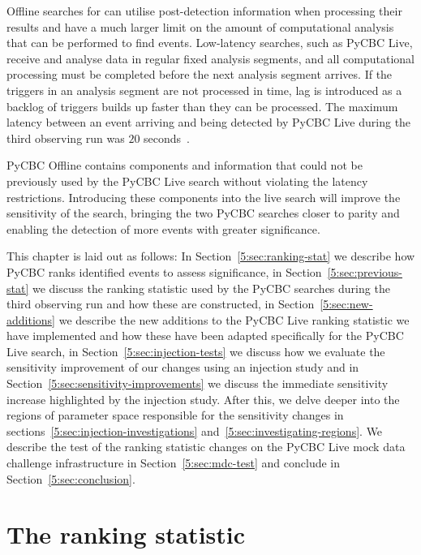 Offline searches for \gws can utilise post-detection information when processing their results and have a much larger limit on the amount of computational analysis that can be performed to find events. Low-latency \gwadj searches, such as PyCBC Live, receive and analyse data in regular fixed analysis segments, and all computational processing must be completed before the next analysis segment arrives. If the triggers in an analysis segment are not processed in time, lag is introduced as a backlog of triggers builds up faster than they can be processed. The maximum latency between an event arriving and being detected by PyCBC Live during the third observing run was $20$ seconds~\cite{PyCBC:2017}.

PyCBC Offline contains components and information that could not be previously used by the PyCBC Live search without violating the latency restrictions. Introducing these components into the live search will improve the sensitivity of the \gwadj search, bringing the two PyCBC searches closer to parity and enabling the detection of more \gwadj events with greater significance.

This chapter is laid out as follows: In Section~\ref{5:sec:ranking-stat} we describe how PyCBC ranks identified events to assess significance, in Section~\ref{5:sec:previous-stat} we discuss the ranking statistic used by the PyCBC searches during the third observing run and how these are constructed, in Section~\ref{5:sec:new-additions} we describe the new additions to the PyCBC Live ranking statistic we have implemented and how these have been adapted specifically for the PyCBC Live search, in Section~\ref{5:sec:injection-tests} we discuss how we evaluate the sensitivity improvement of our changes using an injection study and in Section~\ref{5:sec:sensitivity-improvements} we discuss the immediate sensitivity increase highlighted by the injection study. After this, we delve deeper into the regions of parameter space responsible for the sensitivity changes in sections~\ref{5:sec:injection-investigations} and~\ref{5:sec:investigating-regions}. We describe the test of the ranking statistic changes on the PyCBC Live mock data challenge infrastructure in Section~\ref{5:sec:mdc-test} and conclude in Section~\ref{5:sec:conclusion}.

\section{\label{5:sec:ranking-stat}The ranking statistic}

